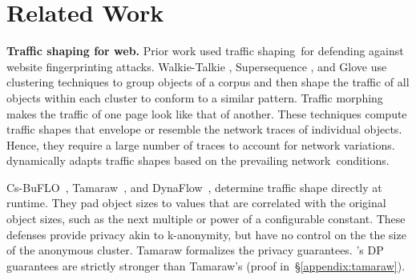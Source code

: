 \section{Related Work}
\label{sec:related}


\textbf{Traffic shaping for web.}
Prior work used traffic shaping~for defending against website
fingerprinting attacks.
%
Walkie-Talkie \cite{wang2017walkietalkie}, Supersequence
\noindent \cite{wang2014supersequence}, and Glove \cite{nithyanand2014glove} use
clustering techniques to group objects of a corpus and then shape the
traffic of all objects within each cluster to conform to a similar pattern.
Traffic morphing \cite{wright2009morphing} makes the traffic of one page look
like that of another.
These techniques compute traffic shapes that envelope or resemble the network
traces of individual objects. Hence, they require a large number of
traces to account for network variations.
{\sys} dynamically adapts traffic shapes based on the
prevailing network~conditions.

Cs-BuFLO~\cite{cai2014csbuflo}, Tamaraw~\cite{cai2014tamaraw}, and
DynaFlow~\cite{lu2018dynaflow}, determine traffic shape directly at runtime.
They pad object sizes to values that are correlated
with the original object sizes, such as the next
multiple or power of a configurable constant.
These defenses provide privacy akin to k-anonymity, but have no control on the
the size of the anonymous cluster.
Tamaraw\cite{cai2014tamaraw} formalizes the privacy guarantees.
{\sys}'s DP guarantees are strictly stronger than Tamaraw's (proof
in~\S\ref{appendix:tamaraw}).
%


